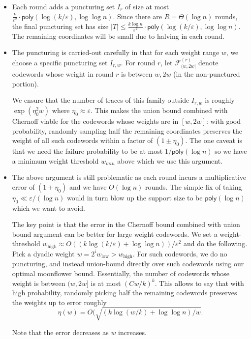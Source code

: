 \documentclass{article}
\renewcommand{\epsilon}{\varepsilon}
\newcommand{\poly}{\mathsf{poly}}
\newcommand{\<}{\langle}
\renewcommand{\>}{\rangle}
\begin{document}
\begin{itemize}
\item 
Each round adds a puncturing set $I_r$ of size at most
$\frac{k}{\varepsilon^2}\cdot \poly(\log(k/\varepsilon),\log\log n)$.
Since there are $R=\Theta(\log n)$ rounds, the final puncturing set has size 
$|T| \le \frac{k \log n}{\varepsilon^2}\cdot \poly(\log(k/\varepsilon),\log\log n)$. The remaining coordinates will be small due to halving in each round. 
\item The puncturing is carried-out carefully in that for each weight range $w$, we choose a specific puncturing set $I_{r,w}$. For round $r$, let $\mathcal{F}^{(r)}_{(w,2w]}$ denote codewords whose weight in round $r$ is between $w, 2w$ (in the non-punctured portion). 

We ensure that the number of traces of this family outside $I_{r,w}$ is roughly $\exp(\eta_0^2 w)$ where $\eta_0 \approx \varepsilon$. This makes the union bound combined with Chernoff viable for the codewords whose weights are in $[w,2w]$: with good probability, randomly sampling half the remaining coordinates preserves the weight of all such codewords within a factor of $(1\pm \eta_0)$. The one caveat is that we need the failure probability to be at most $1/\poly(\log n)$ so we have a minimum weight threshold $w_{min}$ above which we use this argument. 

\item The above argument is still problematic as each round incurs a multiplicative error of $(1+\eta_0)$ and we have $O(\log n)$ rounds. The simple fix of taking $\eta_0 \ll \varepsilon/(\log n)$ would in turn blow up the support size to be $\poly(\log n)$ which we want to avoid. 

The key point is that the error in the Chernoff bound combined with union bound argument can be better for large weight codewords. We set a weight-threshold $w_{\mathrm{high}} \approx O((k \log (k/\epsilon) + \log \log n))/\epsilon^2$ and do the following. Pick a dyadic weight $w = 2^i w_{\mathrm{low}} > w_{\mathrm{high}}$. For such codewords, we do no puncturing, and instead union-bound directly over such codewords using our optimal moonflower bound. Essentially, the number of codewords whose weight is between $(w,2w]$ is at most $(Cw/k)^k$. This allows to say that with high probability, randomly picking half the remaining codewords preserves the weights up to error roughly 
$$\eta(w) = O(\sqrt{ (k \log (w/k) + \log \log n)/w}.$$

Note that the error decreases as $w$ increases. 


\end{itemize}
\end{document}
